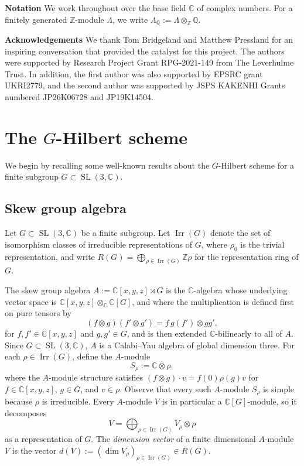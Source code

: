 \documentclass[11pt,reqno]{amsart}
\numberwithin{equation}{section}
\theoremstyle{definition}
\newcommand{\CC}{\ensuremath{\mathbb{C}}}
\newcommand{\QQ}{\ensuremath{\mathbb{Q}}}
\newcommand{\ZZ}{\ensuremath{\mathbb{Z}}}
\newcommand{\0}{\operatorname{0}}
\newcommand{\Irr}{\operatorname{Irr}}
\newcommand{\SL}{\operatorname{SL}}
\begin{document}
\smallskip

 \noindent \textbf{Notation}
 We work throughout over the base field $\CC$ of complex numbers. For a finitely generated $\ZZ$-module $\Lambda$, we write $\Lambda_{\QQ}:=\Lambda\otimes_{\ZZ} \QQ$.
 
\smallskip

 \noindent \textbf{Acknowledgements}
 We thank Tom Bridgeland and Matthew Pressland for an inspiring conversation that provided the catalyst for this project.  The authors were supported by Research Project Grant RPG-2021-149 from The Leverhulme Trust. In addition, the first author was also supported by EPSRC grant UKRI2779, and the second author was supported by JSPS
KAKENHI Grants numbered JP26K06728 and JP19K14504.



 \section{The $G$-Hilbert scheme}
 We begin by recalling some well-known results about the $G$-Hilbert scheme for a finite subgroup $G\subset \SL(3,\mathbb{C})$.

 \subsection{Skew group algebra}
 Let $G\subset \SL(3,\mathbb{C})$ be a finite subgroup. 
  Let $\Irr(G)$ denote the set of isomorphism classes of irreducible representations of $G$, where $\rho_0$ is the trivial representation, and write $R(G)=\bigoplus_{\rho\in \Irr(G)} \ZZ \rho$ for the representation ring of $G$.  

 The skew group algebra $A:= \CC[x,y,z]\rtimes G$ is the $\CC$-algebra whose underlying vector space is $\CC[x,y,z] \otimes_{\CC} \CC[G]$, and where the multiplication is defined first on pure tensors by 
 \[ (f \otimes g)(f' \otimes g') = f\,g(f') \otimes gg', 
 \] for $f,f' \in \CC[x,y,z]$ and $g,g' \in G$, and is then extended \(\CC\)-bilinearly to all of $A$. Since $G\subset \SL(3,\mathbb{C})$,  $A$ is a Calabi--Yau algebra of global dimension three. For each $\rho\in \Irr(G)$, define the $A$-module 
 \[
 S_\rho:= \CC\otimes \rho,
 \]
 where the $A$-module structure satisfies $(f\otimes g)\cdot v=f(0)\rho(g)v$ for $f\in \CC[x,y,z]$, $g\in G$, and $v\in \rho$. Observe that every such $A$-module $S_\rho$ is simple because $\rho$ is irreducible. Every $A$-module $V$ is in particular a $\CC[G]$-module, so it decomposes  
 \begin{equation}
     \label{eqn:Gmodule}
  V=\bigoplus_{\rho\in \Irr(G)}V_\rho\otimes \rho
 \end{equation}
 as a representation of $G$. The \emph{dimension vector} of a finite dimensional $A$-module $V$ is the vector $d(V):=(\dim V_\rho)_{\rho\in \Irr(G)}\in R(G)$. 
 
\end{document}
